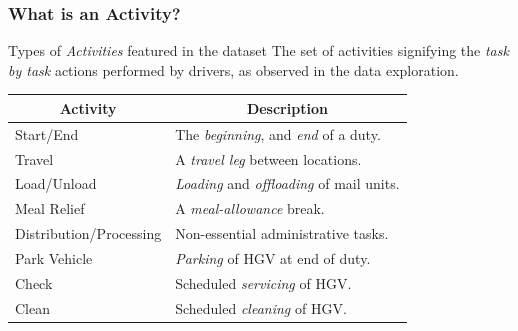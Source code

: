 \documentclass[handout]{beamer}
\begin{document}
\begin{frame}
	\frametitle{What is an Activity?}
	\vspace{\baselineskip}
	\begin{block}{Types of \textit{Activities} featured in the dataset}
	    The set of activities signifying the \textit{task by task} actions performed by drivers, as observed in the data exploration.
	\end{block}
	
	
	\begin{table}[ht]
\small
    \centering 
    \begin{tabular}{|l|l|}
        \hline
        \multicolumn{1}{|c|}{ \textbf{Activity}} & \multicolumn{1}{|c|}{ \textbf{Description}} \\
        \hline
        Start/End & The \textit{beginning}, and \textit{end} of a duty. \\
        \hline
        Travel & A \textit{travel leg} between locations. \\ 
        \hline
        Load/Unload  & \textit{Loading} and \textit{offloading} of mail units.\\ 
        \hline
        Meal Relief & A \textit{meal-allowance} break. \\ 
        \hline
        Distribution/Processing & Non-essential administrative tasks. \\     
        \hline
        Park Vehicle  & \textit{Parking} of HGV at end of duty.\\ 
        \hline
        Check & Scheduled \textit{servicing} of HGV. \\ 
        \hline
        Clean & Scheduled \textit{cleaning} of HGV. \\ 
        \hline
    \end{tabular}
    \medbreak
    \label{table:Activity List}
\end{table}
\vspace{\baselineskip}
\end{frame}


\end{document}
